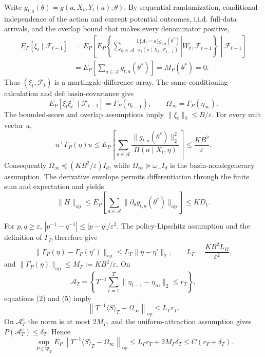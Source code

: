 Write \(g_{t,a}(\theta)=g(a,X_t,Y_t(a);\theta)\). By sequential randomization, conditional independence of the action and current potential outcomes, i.i.d. full-data arrivals, and the overlap bound that makes every denominator positive,
\[
\begin{aligned}
 E_P[\xi_t\mid\mathcal F_{t-1}]
 &=E_P\!\left[E_P\!\left\{\left.\sum_{a\in\mathcal A}
 \frac{\mathbf 1\{A_t=a\}g_{t,a}(\theta^*)}
 {\pi_t(a\mid X_t,\mathcal F_{t-1})}\right|W_t,\mathcal F_{t-1}\right\}\middle|\mathcal F_{t-1}\right]\\
 &=E_P\!\left[\sum_{a\in\mathcal A}g_{t,a}(\theta^*)\right]
 =M_P(\theta^*)=0.
\end{aligned}\tag{1}
\]
Thus \((\xi_t,\mathcal F_t)\) is a martingale-difference array. The same conditioning calculation and \(\mathrm{def:basin\text{-}covariance}\) give
\[
 E_P[\xi_t\xi_t^\top\mid\mathcal F_{t-1}]
 =\Gamma_P(\eta_{t-1}),
 \qquad \Omega_\infty=\Gamma_P(\eta_\infty). \tag{2}
\]
The bounded-score and overlap assumptions imply \(\|\xi_t\|_2\le B/\varepsilon\). For every unit vector \(u\),
\[
 u^\top\Gamma_P(\eta)u
 \le E_P\!\left[\sum_{a\in\mathcal A}
 \frac{\|g_{t,a}(\theta^*)\|_2^2}{\Pi(a\mid X_t,\eta)}\right]
 \le\frac{KB^2}{\varepsilon}. \tag{3}
\]
Consequently \(\Omega_\infty\preceq(KB^2/\varepsilon)I_d\), while \(\Omega_\infty\succeq\omega_-I_d\) is the basin-nondegeneracy assumption. The derivative envelope permits differentiation through the finite sum and expectation and yields
\[
 \|H\|_{\mathrm{op}}
 \le E_P\!\left[\sum_{a\in\mathcal A}
 \|\partial_\theta g_{t,a}(\theta^*)\|_{\mathrm{op}}\right]
 \le KD_1. \tag{4}
\]

For \(p,q\ge\varepsilon\), \(|p^{-1}-q^{-1}|\le|p-q|/\varepsilon^2\). The policy-Lipschitz assumption and the definition of \(\Gamma_P\) therefore give
\[
 \|\Gamma_P(\eta)-\Gamma_P(\eta')\|_{\mathrm{op}}
 \le L_\Gamma\|\eta-\eta'\|_2,
 \qquad L_\Gamma=\frac{KB^2L_\Pi}{\varepsilon^2}, \tag{5}
\]
and \(\|\Gamma_P(\eta)\|_{\mathrm{op}}\le M_\Gamma:=KB^2/\varepsilon\). On
\[
 \mathcal A_T=\left\{T^{-1}\sum_{t=1}^T
 \|\eta_{t-1}-\eta_\infty\|_2\le r_T\right\},
\]
equations (2) and (5) imply
\[
 \left\|T^{-1}\langle S\rangle_T-\Omega_\infty\right\|_{\mathrm{op}}
 \le L_\Gamma r_T. \tag{6}
\]
On \(\mathcal A_T^c\) the norm is at most \(2M_\Gamma\), and the uniform-attraction assumption gives \(P(\mathcal A_T^c)\le\delta_T\). Hence
\[
 \sup_{P\in\mathfrak P_T}E_P\left\|T^{-1}\langle S\rangle_T-\Omega_\infty\right\|_{\mathrm{op}}
 \le L_\Gamma r_T+2M_\Gamma\delta_T
 \le C(r_T+\delta_T). \tag{7}
\]

